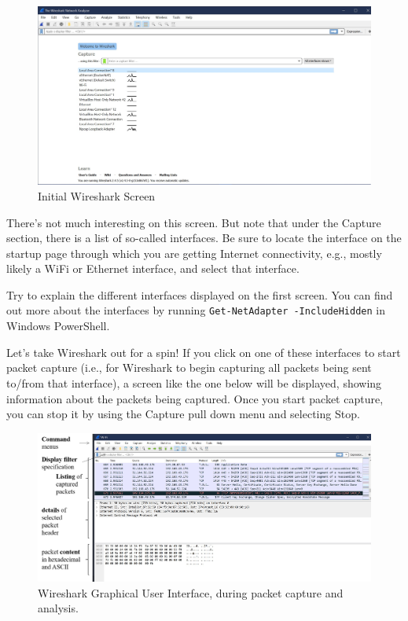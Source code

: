 \documentclass[11pt,a4paper]{article}
\begin{document}
\begin{figure}[h]
    \includegraphics[width=\textwidth]{start_screen.jpg}
    \caption{Initial Wireshark Screen}\label{fig:init-screen}
\end{figure}

There's not much interesting on this screen. But note that under the Capture section,
there is a list of so-called interfaces. Be sure to locate the interface on the startup page through which you are getting Internet
connectivity, e.g., mostly likely a WiFi or Ethernet interface, and select that interface.

\begin{question}
    Try to explain the different interfaces displayed on the first screen. You can find out more about the interfaces by running \texttt{Get-NetAdapter -IncludeHidden} in Windows PowerShell.
\end{question}

Let's take Wireshark out for a spin! If you click on one of these interfaces to start packet
capture (i.e., for Wireshark to begin capturing all packets being sent to/from that
interface), a screen like the one below will be displayed, showing information about the
packets being captured. Once you start packet capture, you can stop it by using the
Capture pull down menu and selecting Stop.

\begin{figure}[H]
    \includegraphics[width=\textwidth]{capturing.png}
    \caption{Wireshark Graphical User Interface, during packet capture and analysis.}%
    \label{fig:packet_capt}
\end{figure}
\end{document}
